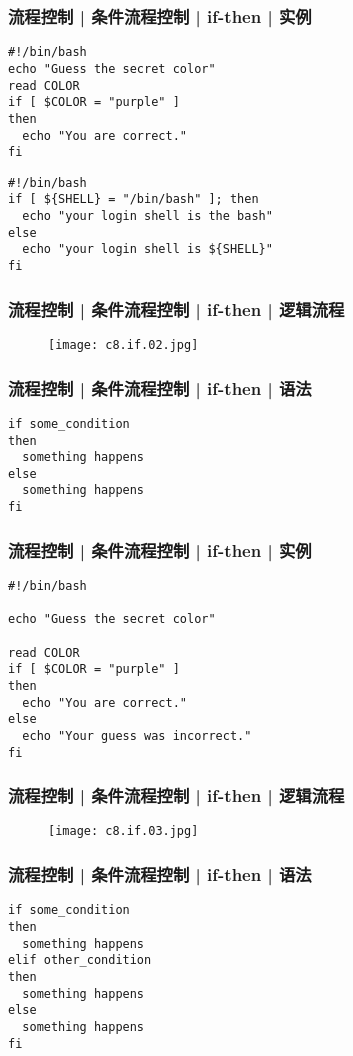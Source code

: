 \begin{frame}[fragile]
  \frametitle{流程控制 | 条件流程控制 | if-then | 实例}
\begin{lstlisting}
#!/bin/bash
echo "Guess the secret color"
read COLOR
if [ $COLOR = "purple" ]
then
  echo "You are correct."
fi
\end{lstlisting}
\pause
\begin{lstlisting}
#!/bin/bash
if [ ${SHELL} = "/bin/bash" ]; then
  echo "your login shell is the bash"
else
  echo "your login shell is ${SHELL}"
fi
\end{lstlisting}
\end{frame}

\begin{frame}
  \frametitle{流程控制 | 条件流程控制 | if-then | 逻辑流程}
  \begin{figure}
    \centering
    \texttt{[image: c8.if.02.jpg]}
  \end{figure}
\end{frame}

\begin{frame}[fragile]
  \frametitle{流程控制 | 条件流程控制 | if-then | \alert{语法}}
\begin{lstlisting}
if some_condition
then
  something happens
else
  something happens
fi
\end{lstlisting}
\end{frame}

\begin{frame}[fragile]
  \frametitle{流程控制 | 条件流程控制 | if-then | 实例}
\begin{lstlisting}
#!/bin/bash

echo "Guess the secret color"

read COLOR
if [ $COLOR = "purple" ]
then
  echo "You are correct."
else
  echo "Your guess was incorrect."
fi
\end{lstlisting}
\end{frame}

\begin{frame}
  \frametitle{流程控制 | 条件流程控制 | if-then | 逻辑流程}
  \begin{figure}
    \centering
    \texttt{[image: c8.if.03.jpg]}
  \end{figure}
\end{frame}

\begin{frame}[fragile]
  \frametitle{流程控制 | 条件流程控制 | if-then | \alert{语法}}
\begin{lstlisting}
if some_condition
then
  something happens
elif other_condition
then
  something happens
else
  something happens
fi
\end{lstlisting}
\end{frame}

